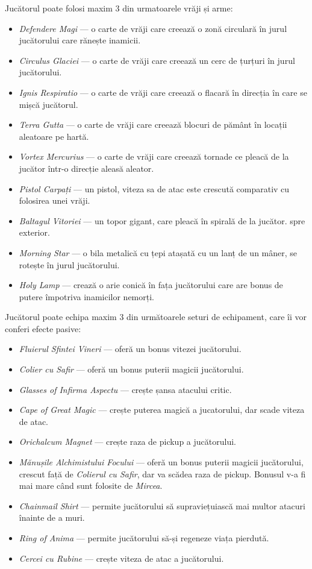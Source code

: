 \documentclass{article}
\begin{document}
    Jucătorul poate folosi maxim 3 din urmatoarele vrăji și arme:
    \begin{itemize}
        \item \emph{Defendere Magi} --- o carte de vrăji care creează o zonă circulară în jurul
        jucătorului care rănește inamicii.
        \item \emph{Circulus Glaciei} --- o carte de vrăji care creează un cerc de țurțuri în jurul
        jucătorului.
        \item \emph{Ignis Respiratio} --- o carte de vrăji care creează o flacară în direcția în
        care se mișcă jucătorul.
        \item \emph{Terra Gutta} --- o carte de vrăji care creează blocuri de pământ în locații
        aleatoare pe hartă.
        \item \emph{Vortex Mercurius} --- o carte de vrăji care creează tornade ce pleacă de la
        jucător într-o direcție aleasă aleator.
        \item \emph{Pistol Carpați} --- un pistol, viteza sa de atac este crescută comparativ cu
        folosirea unei vrăji.
        \item \emph{Baltagul Vitoriei} --- un topor gigant, care pleacă în spirală de la jucător.
        spre exterior.
        \item \emph{Morning Star} --- o bila metalică cu țepi atașată cu un lanț de un mâner, se
        rotește în jurul jucătorului.
        \item \emph{Holy Lamp} --- crează o arie conică în fața jucătorului care are bonus de putere
        împotriva inamicilor nemorți.
    \end{itemize}

    Jucătorul poate echipa maxim 3 din următoarele seturi de echipament, care îi vor conferi
    efecte pasive:
    \begin{itemize}
        \item \emph{Fluierul Sfintei Vineri} --- oferă un bonus vitezei jucătorului.
        \item \emph{Colier cu Safir} --- oferă un bonus puterii magicii jucătorului.
        \item \emph{Glasses of Infirma Aspectu} --- crește șansa atacului critic.
        \item \emph{Cape of Great Magic} --- crește puterea magică a jucatorului, dar scade viteza
        de atac.
        \item \emph{Orichalcum Magnet} --- crește raza de pickup a jucătorului.
        \item \emph{Mănușile Alchimistului Focului} --- oferă un bonus puterii magicii jucătorului,
        crescut față de \emph{Colierul cu Safir}, dar va scădea raza de pickup. Bonusul v-a fi mai
        mare când sunt folosite de \emph{Mircea}.
        \item \emph{Chainmail Shirt} --- permite jucătorului să supraviețuiască mai multor atacuri
        înainte de a muri.
        \item \emph{Ring of Anima} --- permite jucătorului să-și regeneze viața pierdută.
        \item \emph{Cercei cu Rubine} --- crește viteza de atac a jucătorului.
    \end{itemize}
\end{document}

